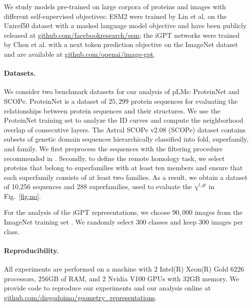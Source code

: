 \documentclass{article}
\begin{document}
We study models pre-trained on large corpora of proteins and images with different self-supervised objectives: ESM2 were trained by Lin et al. \cite{esm2} on the Uniref50 dataset with a masked language model objective and have been publicly released at \href{https://github.com/facebookresearch/esm}{github.com/facebookresearch/esm}; the iGPT networks were trained by Chen et al. \cite{igpt} with a next token prediction objective on the ImageNet dataset and are available at \href{https://github.com/openai/image-gpt}{github.com/openai/image-gpt}.




\paragraph{Datasets.}
\label{sec:datasets} 
%
We consider two benchmark datasets for our analysis of pLMs: ProteinNet and SCOPe.
%
ProteinNet  \cite{protein-net} is a dataset of $25,299$ protein sequences for evaluating the relationships between protein sequences and their structures. We use the ProteinNet training set to analyze the ID curves and compute the neighborhood overlap of consecutive layers.
%
The Astral SCOPe v2.08 (SCOPe) dataset \cite{scope2.08} contains subsets of genetic domain sequences
hierarchically classified into fold, superfamily, and family. We first preprocess the sequences with the filtering procedure recommended in \cite{Sding2011ProteinSC}. Secondly, to define the remote homology task, we select proteins that belong to superfamilies with at least ten members and ensure that each superfamily consists of at least two families. As a result, we obtain a dataset of 10,256 sequences and 288 superfamilies, used to evaluate the $\chi^{l,gt}$ in Fig.~\ref{fig:no}.
%

For the analysis of the iGPT representations, we choose $90,000$ images from the ImageNet training set \cite{deng2009imagenet}. We randomly select $300$ classes and keep $300$ images per class.

\paragraph{Reproducibility.} All experiments are performed on a machine with $2$ Intel(R) Xeon(R) Gold $6226$ processors, $256$GB of RAM, and $2$ Nvidia V100 GPUs with $32$GB memory. We provide code to reproduce our experiments and our
analysis online
at \href{https://github.com/diegodoimo/geometry_representations}{github.com/diegodoimo/geometry\_representations}.
\end{document}
